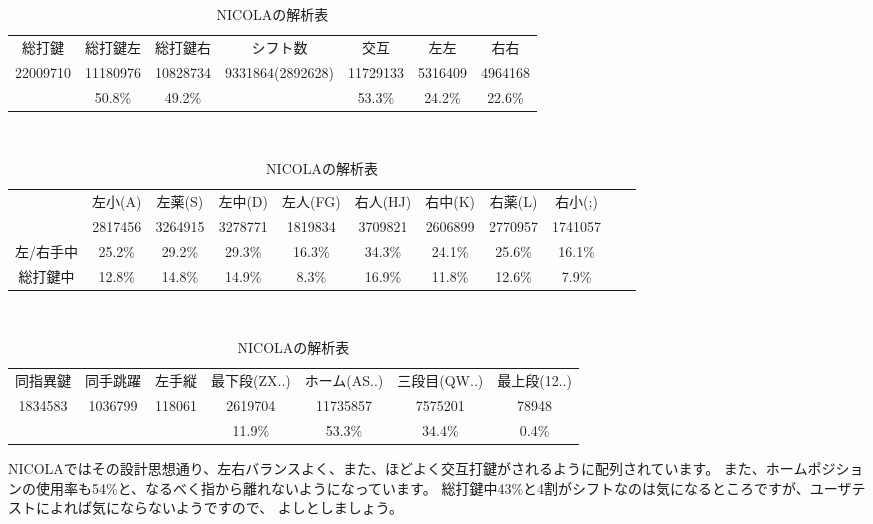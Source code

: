 \begin{table}[htbp]
 \caption{NICOLAの解析表}
 \begin{center}
 \begin{tabular}{cccc|ccc}
 \hline
総打鍵 & 総打鍵左 & 総打鍵右 & シフト数 & 交互 & 左左 & 右右 \\
 22009710 & 11180976 & 10828734 & 9331864(2892628) & 11729133 & 5316409 & 4964168\\
 & 50.8\% & 49.2\% &  & 53.3\% & 24.2\% & 22.6\%\\
 \hline
 \end{tabular}

 　\vspace{1zw}　

 \begin{tabular}{ccccccccccc}
 \hline
& 左小(A) & 左薬(S) & 左中(D) & 左人(FG) & 右人(HJ) & 右中(K) & 右薬(L) & 右小(;)\\
& 2817456 & 3264915 & 3278771 & 1819834 & 3709821 & 2606899 & 2770957 & 1741057\\
左/右手中 & 25.2\% & 29.2\% & 29.3\% & 16.3\% & 34.3\% & 24.1\% & 25.6\% & 16.1\%\\
総打鍵中 & 12.8\% & 14.8\% & 14.9\% & 8.3\% & 16.9\% & 11.8\% & 12.6\% & 7.9\%\\
\hline
 \end{tabular}

 　\vspace{1zw}　

 \begin{tabular}{ccc|cccc}
 \hline
 同指異鍵 & 同手跳躍 & 左手縦 & 最下段(ZX..) & ホーム(AS..) & 三段目(QW..) & 最上段(12..)\\
1834583 & 1036799 & 118061 & 2619704 & 11735857 & 7575201 & 78948\\
 &  &  & 11.9\% & 53.3\% & 34.4\% & 0.4\%\\
\hline
 \end{tabular}
 \end{center}
 \label{tbl:nicola}
\end{table}




NICOLAではその設計思想通り、左右バランスよく、また、ほどよく交互打鍵がされるように配列されています。
また、ホームポジションの使用率も54\%と、なるべく指から離れないようになっています。
総打鍵中43\%と4割がシフトなのは気になるところですが、ユーザテストによれば気にならないようですので、
よしとしましょう。

